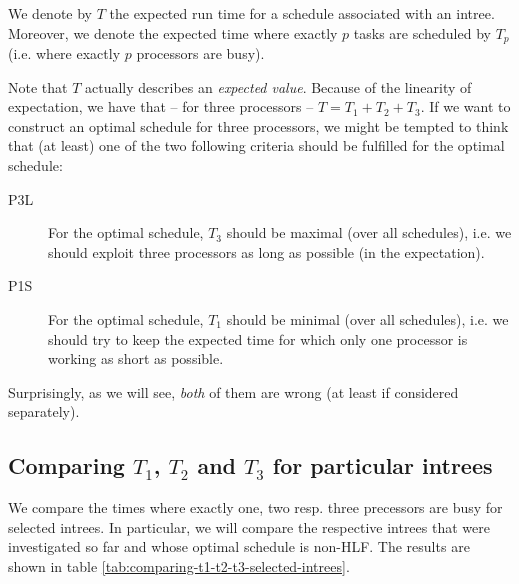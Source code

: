 \begin{definition}
  We denote by $T$ the expected run time for a schedule associated with an intree. 
  Moreover, we denote the expected time where exactly $p$ tasks are scheduled by $T_p$ (i.e. where exactly $p$ processors are busy).
\end{definition}

Note that $T$ actually describes an \emph{expected value}. Because of the linearity of expectation, we have that -- for three processors -- $T=T_1 + T_2 + T_3$. If we want to construct an optimal schedule for three processors, we might be tempted to think that (at least) one of the two following criteria should be fulfilled for the optimal schedule:

\begin{description}
\item[P3L] For the optimal schedule, $T_3$ should be maximal (over all schedules), i.e. we should exploit three processors as long as possible (in the expectation).
\item[P1S] For the optimal schedule, $T_1$ should be minimal (over all schedules), i.e. we should try to keep the expected time for which only one processor is working as short as possible.
\end{description}

Surprisingly, as we will see, \emph{both} of them are wrong (at least if considered separately).

\subsection{Comparing $T_1$, $T_2$ and $T_3$ for particular intrees}
\label{sec:comparing-t1-t2-t3-particular-intrees}

We compare the times where exactly one, two resp. three precessors are busy for selected intrees. In particular, we will compare the respective intrees that were investigated so far and whose optimal schedule is non-HLF. The results are shown in table \ref{tab:comparing-t1-t2-t3-selected-intrees}.

